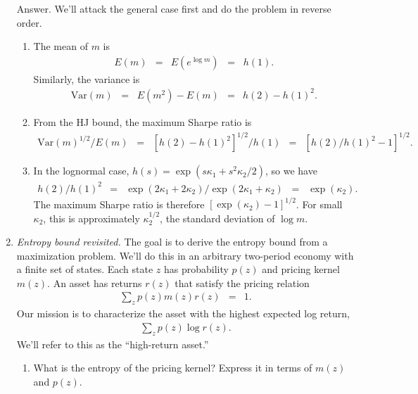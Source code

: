 \documentclass[11pt]{article}
\begin{document}
\begin{enumerate}
Answer.
We'll attack the general case first and
do the problem in reverse order.
\begin{enumerate}
\item The mean of $m$ is
\begin{eqnarray*}
    E(m) &=& E (e^{\log m}) \;\;=\;\; h(1) .
\end{eqnarray*}
Similarly, the variance is
\begin{eqnarray*}
    \mbox{Var}(m) \;\;=\;\; E(m^2) - E(m)  &=& h(2) - h(1)^2 .
\end{eqnarray*}
\item From the HJ bound, the maximum Sharpe ratio is
\begin{eqnarray*}
    \mbox{Var}(m)^{1/2}/E(m) \;\;=\;\; [h(2) - h(1)^2]^{1/2} / h(1)
        &=& [h(2)/h(1)^2 - 1]^{1/2}  .
\end{eqnarray*}

\item In the lognormal case,
$ h(s) = \exp(s \kappa_1 + s^2 \kappa_2 /2 )$,
so we have
\begin{eqnarray*}
    h(2)/h(1)^2 &=& \exp(2 \kappa_1 + 2 \kappa_2) / \exp(2 \kappa_1 + \kappa_2)
            \;\;=\;\; \exp(\kappa_2) .
\end{eqnarray*}
The maximum Sharpe ratio is therefore $ [\exp(\kappa_2) - 1]^{1/2} $.
For small $\kappa_2$, this is approximately $\kappa_2^{1/2} $,
the standard deviation of $\log m$.
\end{enumerate}


\item {\it Entropy bound revisited.\/}
The goal is to derive the entropy bound from a maximization problem.
We'll do this in an arbitrary two-period economy with a finite set of states.
Each state $z$ has probability $p(z)$
and pricing kernel $m(z)$.
An asset has returns $r(z)$ that satisfy the pricing relation
\begin{eqnarray}
    \sum_z p(z) m(z) r(z) &=& 1.
    \label{eq:pricing-relation}
\end{eqnarray}
Our mission is to characterize the asset with the highest expected log return,
\begin{eqnarray*}
    \sum_z p(z) \log r(z) .
\end{eqnarray*}
We'll refer to this as the ``high-return asset.''
%
\begin{enumerate}
\item What is the entropy of the pricing kernel?
Express it in terms of $m(z)$ and $p(z)$.


\end{enumerate}
\end{enumerate}
\end{document}
